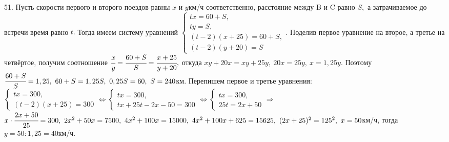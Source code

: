 51. Пусть скорости первого и второго поездов равны $x$ и $y$км/ч соответственно, расстояние между B и C равно $S,$ а затрачиваемое до встречи время равно $t.$ Тогда имеем систему уравнений
$\begin{cases} tx=60+S,\\ ty=S,\\ (t-2)(x+25)=60+S,\\ (t-2)(y+20)=S\end{cases}$. Поделив первое уравнение на второе, а третье на четвёртое, получим соотношение $\cfrac{x}{y}=\cfrac{60+S}{S}=\cfrac{x+25}{y+20},$ откуда $xy+20x=xy+25y,\ 20x=25y,\ x=1,25y.$ Поэтому $\cfrac{60+S}{S}=1,25,\ 60+S=1,25S,\ 0,25S=60,\ S=240$км. Перепишем первое и третье уравнения: $\begin{cases}tx=300,\\(t-2)(x+25)=300\end{cases}\Leftrightarrow\begin{cases}tx=300,\\tx+25t-2x-50=300\end{cases}\Leftrightarrow
\begin{cases}tx=300,\\25t=2x+50\end{cases}\Rightarrow$\\$ x\cdot\cfrac{2x+50}{25}=300,\ 2x^2+50x=7500,\ 4x^2+100x=15000,\ 4x^2+100x+625=15625,\ (2x+25)^2=125^2,\ x=50$км/ч, тогда $y=50:1,25=40$км/ч.\\
